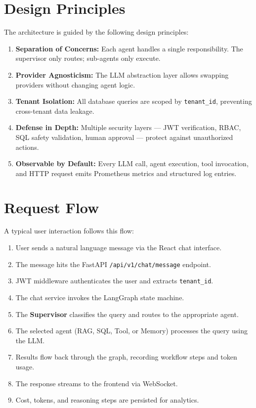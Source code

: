 \documentclass[12pt, a4paper]{report}
\begin{document}
\section{Design Principles}

The architecture is guided by the following design principles:

\begin{enumerate}
    \item \textbf{Separation of Concerns:} Each agent handles a single responsibility. The supervisor only routes; sub-agents only execute.
    \item \textbf{Provider Agnosticism:} The LLM abstraction layer allows swapping providers without changing agent logic.
    \item \textbf{Tenant Isolation:} All database queries are scoped by \texttt{tenant\_id}, preventing cross-tenant data leakage.
    \item \textbf{Defense in Depth:} Multiple security layers — JWT verification, RBAC, SQL safety validation, human approval — protect against unauthorized actions.
    \item \textbf{Observable by Default:} Every LLM call, agent execution, tool invocation, and HTTP request emits Prometheus metrics and structured log entries.
\end{enumerate}

\section{Request Flow}

A typical user interaction follows this flow:

\begin{enumerate}
    \item User sends a natural language message via the React chat interface.
    \item The message hits the FastAPI \texttt{/api/v1/chat/message} endpoint.
    \item JWT middleware authenticates the user and extracts \texttt{tenant\_id}.
    \item The chat service invokes the LangGraph state machine.
    \item The \textbf{Supervisor} classifies the query and routes to the appropriate agent.
    \item The selected agent (RAG, SQL, Tool, or Memory) processes the query using the LLM.
    \item Results flow back through the graph, recording workflow steps and token usage.
    \item The response streams to the frontend via WebSocket.
    \item Cost, tokens, and reasoning steps are persisted for analytics.
\end{enumerate}
\end{document}
